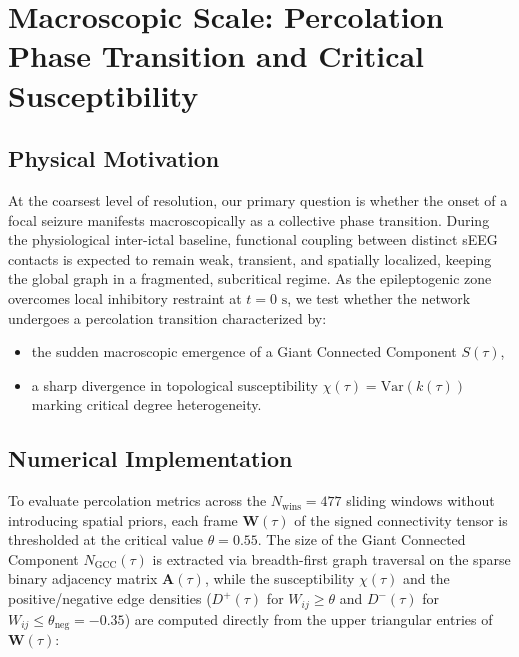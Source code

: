 \section[Macroscopic Scale: Percolation and Susceptibility]{Macroscopic Scale: Percolation Phase Transition and Critical Susceptibility}
\label{sec:act1_macro}

\subsection{Physical Motivation}
At the coarsest level of resolution, our primary question is whether the onset of a focal seizure manifests macroscopically as a collective phase transition. During the physiological inter-ictal baseline, functional coupling between distinct sEEG contacts is expected to remain weak, transient, and spatially localized, keeping the global graph in a fragmented, subcritical regime. As the epileptogenic zone overcomes local inhibitory restraint at $t = 0\text{ s}$, we test whether the network undergoes a percolation transition characterized by:
\begin{itemize}
    \item the sudden macroscopic emergence of a Giant Connected Component $S(\tau)$,
    \item a sharp divergence in topological susceptibility $\chi(\tau) = \text{Var}(k(\tau))$ marking critical degree heterogeneity.
\end{itemize}

\subsection{Numerical Implementation}
To evaluate percolation metrics across the $N_\text{wins} = 477$ sliding windows without introducing spatial priors, each frame $\mathbf{W}(\tau)$ of the signed connectivity tensor is thresholded at the critical value $\theta = 0.55$. The size of the Giant Connected Component $N_{\text{GCC}}(\tau)$ is extracted via breadth-first graph traversal on the sparse binary adjacency matrix $\mathbf{A}(\tau)$, while the susceptibility $\chi(\tau)$ and the positive/negative edge densities ($D^{+}(\tau)$ for $W_{ij} \geq \theta$ and $D^{-}(\tau)$ for $W_{ij} \leq \theta_{\text{neg}} = -0.35$) are computed directly from the upper triangular entries of $\mathbf{W}(\tau)$:

